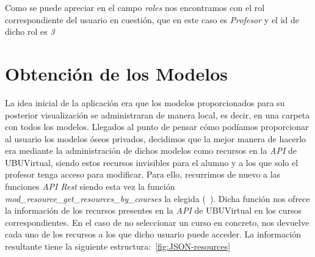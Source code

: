Como se puede apreciar en el campo \textit{roles} nos encontramos con el rol correspondiente del usuario en cuestión, que en este caso es \textit{Profesor} y el id de dicho rol es \textit{3}

\section{Obtención de los Modelos}
La idea inicial de la aplicación era que los modelos proporcionados para su posterior visualización se administraran de manera local, es decir, en una carpeta con todos los modelos. Llegados al punto de pensar cómo podíamos proporcionar al usuario los modelos óseos privados, decidimos que la mejor manera de hacerlo era mediante la administración de dichos modelos como recursos en la \textit{API} de UBUVirtual, siendo estos recursos invisibles para el alumno y a los que solo el profesor tenga acceso para modificar. Para ello, recurrimos de nuevo a las funciones \textit{API Rest} siendo esta vez la función \textit{mod_resource_get_resources_by_courses} la elegida (~\cite{moodle:web-service-api-functions}). Dicha función nos ofrece la información de los recursos presentes en la \textit{API} de UBUVirtual en los cursos correspondientes. En el caso de no seleccionar un curso en concreto, nos devuelve cada uno de los recursos a los que dicho usuario puede acceder. La información resultante tiene la siguiente estructura:~\ref{fig:JSON-resources}